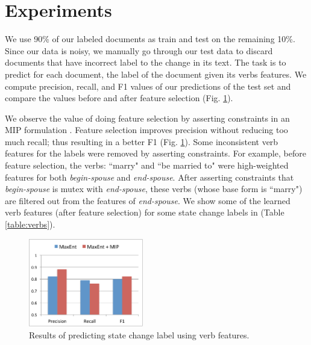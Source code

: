 \section{Experiments}

We use 90\% of our labeled documents as train and test on the remaining 10\%. Since our data is noisy, we manually go through our test data to discard documents that have incorrect label to the change in its text. The task is to predict for each document, the label of the document given its verbs features. We compute precision, recall, and F1 values of our predictions of the test set and compare the values before and after feature selection (Fig. \ref{fig:result}).


We observe the value of doing feature selection by asserting constraints in an MIP formulation%
. Feature selection improves precision without reducing too much recall; thus resulting in a better F1 (Fig. \ref{fig:result}). Some inconsistent verb features for the labels were removed by asserting constraints. For example, before feature selection, the verbs: ``marry" and ``be married to" were high-weighted features for both \textit{begin-spouse} and \textit{end-spouse}. After asserting constraints that \textit{begin-spouse} is mutex with \textit{end-spouse}, these verbs (whose base form is ``marry") are filtered out from the features of \textit{end-spouse}. We show some of the learned verb features (after feature selection) for some state change labels in (Table \ref{table:verbs}).

\begin{figure}
\begin{center}
\includegraphics[width=5cm,keepaspectratio=true]{figures/result.pdf}
\caption{\label{fig:result} Results of predicting state change label using verb features.}
\end{center}
\end{figure}

